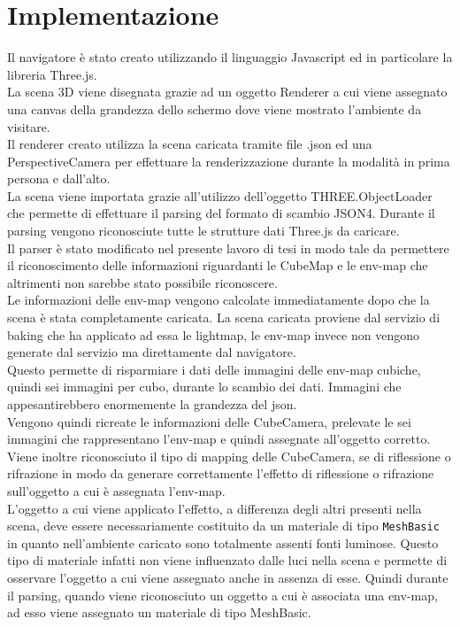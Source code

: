 \section{Implementazione}
\label{sec:chapter_navigazione_scena_implementazione}

Il navigatore è stato creato utilizzando il linguaggio Javascript ed in particolare la libreria Three.js.
\\
La scena 3D viene disegnata grazie ad un oggetto Renderer a cui viene assegnato una canvas della grandezza dello schermo dove viene mostrato l’ambiente da visitare.
\\
Il renderer creato utilizza la scena caricata tramite file .json ed una PerspectiveCamera per effettuare la renderizzazione durante la modalità in prima persona e dall’alto.
\\
La scena viene importata grazie all’utilizzo dell’oggetto THREE.ObjectLoader che permette di effettuare il parsing del formato di scambio JSON4.
Durante il parsing vengono riconosciute tutte le strutture dati Three.js da caricare.
\\
Il parser è stato modificato nel presente lavoro di tesi in modo tale da permettere il riconoscimento delle informazioni riguardanti le CubeMap e le env-map che altrimenti non sarebbe stato possibile riconoscere.
\\
Le informazioni delle env-map vengono calcolate immediatamente dopo che la scena è stata completamente caricata. La scena caricata proviene dal servizio di baking che ha applicato ad essa le lightmap, le env-map invece non vengono generate dal servizio ma direttamente dal navigatore.
\\
Questo permette di risparmiare i dati delle immagini delle env-map cubiche, quindi sei immagini per cubo, durante lo scambio dei dati. Immagini che appesantirebbero enormemente la grandezza del json.
\\
Vengono quindi ricreate le informazioni delle CubeCamera, prelevate le sei immagini che rappresentano l’env-map e quindi assegnate all’oggetto corretto. Viene inoltre riconosciuto il tipo di mapping delle CubeCamera, se di riflessione o rifrazione in modo da generare correttamente l’effetto di riflessione o rifrazione sull’oggetto a cui è assegnata l’env-map.
\\
L’oggetto a cui viene applicato l’effetto, a differenza degli altri presenti nella scena, deve essere necessariamente costituito da un materiale di tipo \texttt{MeshBasic} in quanto nell’ambiente caricato sono totalmente assenti fonti luminose. Questo tipo di materiale infatti non viene influenzato dalle luci nella scena e permette di osservare l’oggetto a cui viene assegnato anche in assenza di esse. Quindi durante il parsing, quando viene riconosciuto un oggetto a cui è associata una env-map, ad esso viene assegnato un materiale di tipo MeshBasic.

